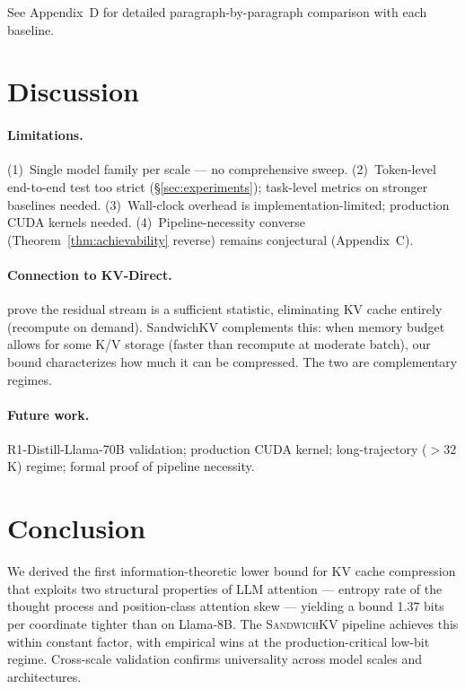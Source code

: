 \documentclass[11pt]{article}
\theoremstyle{definition}
\newcommand{\eq}{\textsc{SandwichKV}}
\begin{document}
\noindent See Appendix~D for detailed paragraph-by-paragraph comparison with each baseline.

\section{Discussion}
\label{sec:discussion}

\paragraph{Limitations.}
(1)~Single model family per scale --- no comprehensive sweep.
(2)~Token-level end-to-end test too strict (\S\ref{sec:experiments}); task-level metrics on stronger baselines needed.
(3)~Wall-clock overhead is implementation-limited; production CUDA kernels needed.
(4)~Pipeline-necessity converse (Theorem~\ref{thm:achievability} reverse) remains conjectural (Appendix~C).

\paragraph{Connection to KV-Direct.}
\citet{kv-direct} prove the residual stream is a sufficient statistic, eliminating KV cache entirely (recompute on demand). SandwichKV complements this: when memory budget allows for some K/V storage (faster than recompute at moderate batch), our bound characterizes how much it can be compressed. The two are complementary regimes.

\paragraph{Future work.} R1-Distill-Llama-70B validation; production CUDA kernel; long-trajectory ($>32$K) regime; formal proof of pipeline necessity.

\section{Conclusion}
\label{sec:conclusion}
We derived the first information-theoretic lower bound for KV cache compression that exploits two structural properties of LLM attention --- entropy rate of the thought process and position-class attention skew --- yielding a bound 1.37 bits per coordinate tighter than \citet{turboquant} on Llama-8B. The \eq{} pipeline achieves this within constant factor, with empirical wins at the production-critical low-bit regime. Cross-scale validation confirms universality across model scales and architectures.
\end{document}
